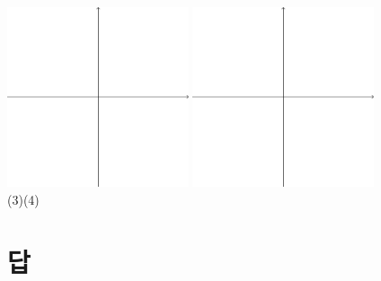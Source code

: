\documentclass{oblivoir}
\begin{document}
\begin{center}
\includegraphics[width=0.4\textwidth]{xyaxes}\quad
\includegraphics[width=0.4\textwidth]{xyaxes}\\
(3)\qquad\qquad\qquad\qquad\qquad\qquad\quad(4)
\end{center}

\section*{답}
\end{document}
